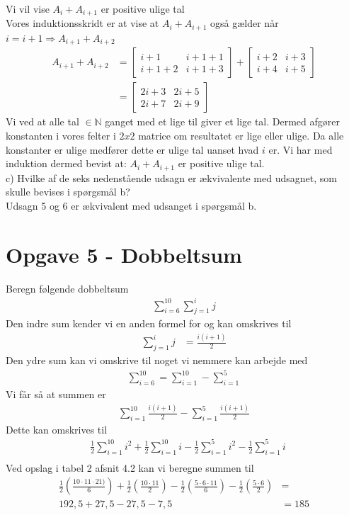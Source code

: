 \documentclass[a4paper,10pt]{article}
\begin{document}
Vi vil vise $A_i + A_{i+1}$ er positive ulige tal\\
Vores induktionsskridt er at vise at $A_i + A_{i+1}$ også gælder når $ i = i+1 \Rightarrow A_{i+1} + A_{i+2}$
\begin{align*}
A_{i+1}+A_{i+2} &= \begin{bmatrix}
i+1 & i+1+1 \\ i+1+2 & i+1+3
\end{bmatrix}+\begin{bmatrix}
i+2 & i+3 \\ i+4 & i+5
\end{bmatrix}\\ &= \begin{bmatrix}
2i+3 & 2i+5 \\ 2i+7 & 2i+9
\end{bmatrix}
\end{align*}
Vi ved at alle tal $\in \mathbb{N}$ ganget med et lige til giver et lige tal. Dermed afgører konstanten i vores felter i $2x2$ matrice om resultatet er lige eller ulige. Da alle konstanter er ulige medfører dette er ulige tal uanset hvad $i$ er.
Vi har med induktion dermed bevist at: $A_i + A_{i+1}$ er positive ulige tal.\\
c) Hvilke af de seks nedenstående udsagn er ækvivalente med udsagnet, som skulle bevises i spørgsmål b?\\
Udsagn 5 og 6 er ækvivalent med udsanget i spørgsmål b. 
\section{Opgave 5 - Dobbeltsum}
Beregn følgende dobbeltsum
\begin{align*}
\sum_{i=6}^{10} \sum_{j=1}^{i}j
\end{align*}
Den indre sum kender vi en anden formel for og kan omskrives til 
\begin{align*}
\sum_{j=1}^{i}j &= \frac{i(i+1)}{2}
\end{align*}
Den ydre sum kan vi omskrive til noget vi nemmere kan arbejde med
\begin{align*}
\sum_{i=6}^{10} = \sum_{i=1}^{10} - \sum_{i=1}^{5}
\end{align*}
Vi får så at summen er
\begin{align*}
\sum_{i=1}^{10}\frac{i(i+1)}{2} - \sum_{i=1}^{5}\frac{i(i+1)}{2}
\end{align*}
Dette kan omskrives til
\begin{align*}
&\frac{1}{2}\sum_{i=1}^{10}i^2 + \frac{1}{2}\sum_{i=1}^{10}i - \frac{1}{2}\sum_{i=1}^{5}i^2 - \frac{1}{2}\sum_{i=1}^{5}i\\
\end{align*}
Ved opslag i tabel 2 afsnit 4.2 kan vi beregne summen til
\begin{align*}
\frac{1}{2}\left(\frac{10 \cdot 11 \cdot 21)}{6}\right) + \frac{1}{2}\left( \frac{10 \cdot 11}{2} \right)  - \frac{1}{2} \left(\frac{5 \cdot 6 \cdot 11}{6}\right) - \frac{1}{2} \left(\frac{5 \cdot 6}{2} \right)&= \\
192,5 + 27,5 - 27,5 - 7,5 &= 185
\end{align*}
\end{document}
